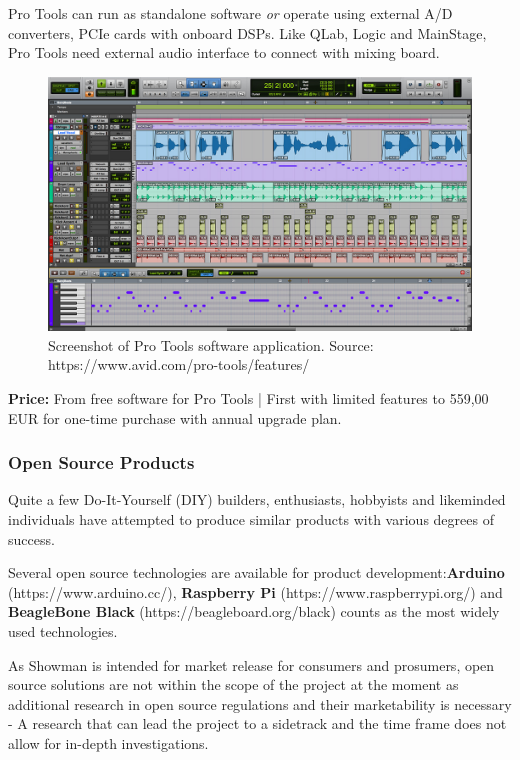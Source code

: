 Pro Tools can run as standalone software \textit{or} operate using external A/D converters, PCIe cards with onboard DSPs. Like QLab, Logic and MainStage, Pro Tools need external audio interface to connect with mixing board. \\

\begin{figure}[H]
\centering
\includegraphics[scale=0.3]{./pictures/protools.png}
\caption{Screenshot of Pro Tools software application. Source: https://www.avid.com/pro-tools/features/}
\label{fig:protools.png}
\end{figure}

\textbf{Price:} From free software for Pro Tools | First with limited features to  559,00 EUR for one-time purchase with annual upgrade plan.

\subsubsection{Open Source Products}
Quite a few Do-It-Yourself (DIY) builders, enthusiasts, hobbyists and likeminded individuals have attempted to produce similar products with various degrees of success. \newline

Several open source technologies are available for product development:\textbf{Arduino} (https://www.arduino.cc/), \textbf{Raspberry Pi} (https://www.raspberrypi.org/) and \textbf{BeagleBone Black} (https://beagleboard.org/black) counts as the most widely used technologies. \newline

As Showman is intended for market release for consumers and prosumers, open source solutions are not within the scope of the project at the moment as additional research in open source regulations and their marketability is necessary - A research that can lead the project to a sidetrack and the time frame does not allow for in-depth investigations. \\

